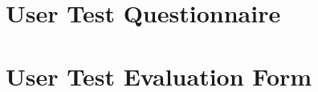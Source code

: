 \documentclass[10pt,a4paper]{scrartcl}
\begin{document}
\clearpage






\appendix

\renewcommand\appendixpagename{\usekomafont{disposition}Appendices}
\appendixpage

\section{User Test Questionnaire}
\label{apx:questionnaire}


\section{User Test Evaluation Form}
\label{apx:evaluation-form}

\end{document}
